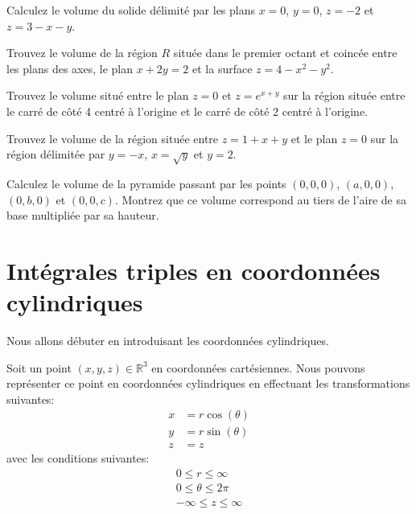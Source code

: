 \documentclass[]{book}
\theoremstyle{definition}
\theoremstyle{definition}
\theoremstyle{definition}
\theoremstyle{remark}
\let\BeginKnitrBlock\begin \let\EndKnitrBlock\end
\begin{document}
\BeginKnitrBlock{example}
\protect\hypertarget{exm:unnamed-chunk-273}{}{\label{exm:unnamed-chunk-273}
}Calculez le volume du solide délimité par les plans \(x=0\), \(y=0\),
\(z=-2\) et \(z=3-x-y\).
\EndKnitrBlock{example}
\vspace*{10cm}

\BeginKnitrBlock{example}
\protect\hypertarget{exm:unnamed-chunk-274}{}{\label{exm:unnamed-chunk-274}
}Trouvez le volume de la région \(R\) située dans le premier octant et
coincée entre les plans des axes, le plan \(x+2y=2\) et la surface
\(z=4-x^2-y^2\).
\EndKnitrBlock{example}
\vspace*{8cm}

\BeginKnitrBlock{example}
\protect\hypertarget{exm:unnamed-chunk-275}{}{\label{exm:unnamed-chunk-275}
}Trouvez le volume situé entre le plan \(z=0\) et \(z=e^{x+y}\) sur la
région située entre le carré de côté 4 centré à l'origine et le carré de
côté 2 centré à l'origine.
\EndKnitrBlock{example}
\vspace*{10cm}

\BeginKnitrBlock{example}
\protect\hypertarget{exm:unnamed-chunk-276}{}{\label{exm:unnamed-chunk-276}
}Trouvez le volume de la région située entre \(z=1+x+y\) et le plan
\(z=0\) sur la région délimitée par \(y=-x\), \(x=\sqrt{y}\) et \(y=2\).
\EndKnitrBlock{example}
\vspace*{8cm}

\BeginKnitrBlock{example}
\protect\hypertarget{exm:unnamed-chunk-277}{}{\label{exm:unnamed-chunk-277}
}Calculez le volume de la pyramide passant par les points \((0,0,0)\),
\((a,0,0)\), \((0,b,0)\) et \((0,0,c)\). Montrez que ce volume
correspond au tiers de l'aire de sa base multipliée par sa hauteur.
\EndKnitrBlock{example}
\vspace*{10cm}

\hypertarget{integrales-triples-en-coordonnees-cylindriques}{%
\section{Intégrales triples en coordonnées
cylindriques}\label{integrales-triples-en-coordonnees-cylindriques}}

Nous allons débuter en introduisant les coordonnées cylindriques.
\BeginKnitrBlock{definition}[Coordonnées cylindriques]
\protect\hypertarget{def:unnamed-chunk-278}{}{\label{def:unnamed-chunk-278}
{} }Soit un point
\((x,y,z)\in\mathbb{R}^3\) en coordonnées cartésiennes. Nous pouvons
représenter ce point en coordonnées cylindriques en effectuant les
transformations suivantes: \begin{align*}
x &= r\cos(\theta) \\
y &= r\sin(\theta) \\
z &= z
\end{align*} avec les conditions suivantes: \begin{align*}
0 \leq r \leq \infty \\
0 \leq \theta \leq 2\pi \\
-\infty \leq z \leq \infty
\end{align*}
\EndKnitrBlock{definition}
\end{document}
